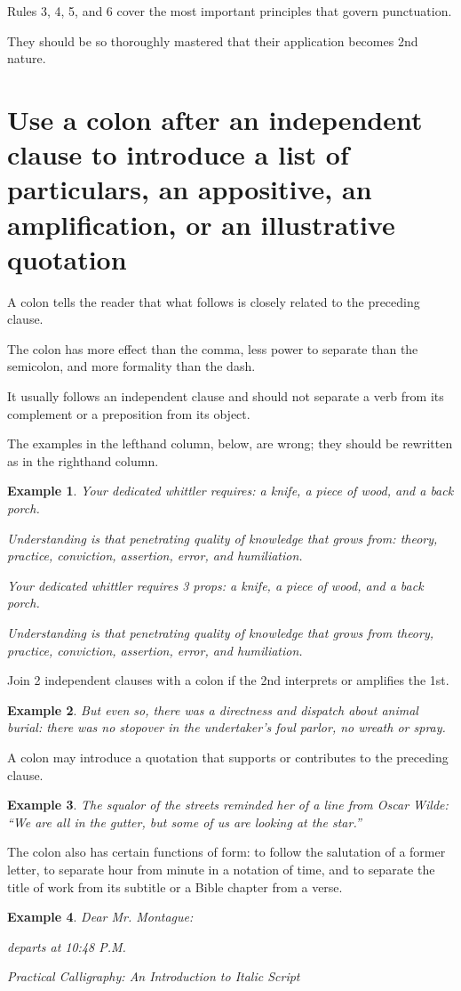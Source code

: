 \documentclass{book}
\numberwithin{equation}{section}
\newtheorem{example}{Example}[chapter]
\begin{document}
%
Rules 3, 4, 5, and 6 cover the most important principles that govern punctuation.

They should be so thoroughly mastered that their application becomes 2nd nature.

\section{Use a colon after an independent clause to introduce a list of particulars, an appositive, an amplification, or an illustrative quotation}
A colon tells the reader that what follows is closely related to the preceding clause.

The colon has more effect than the comma, less power to separate than the semicolon, and more formality than the dash.

It usually follows an independent clause and should not separate a verb from its complement or a preposition from its object.

The examples in the lefthand column, below, are wrong; they should be rewritten as in the righthand column.
\begin{example}
    Your dedicated whittler requires: a knife, a piece of wood, and a back porch.
    
    Understanding is that penetrating quality of knowledge that grows from: theory, practice, conviction, assertion, error, and humiliation.
    
    Your dedicated whittler requires 3 props: a knife, a piece of wood, and a back porch.
    
    Understanding is that penetrating quality of knowledge that grows from theory, practice, conviction, assertion, error, and humiliation.
\end{example}
Join 2 independent clauses with a colon if the 2nd interprets or amplifies the 1st.
\begin{example}
    But even so, there was a directness and dispatch about animal burial: there was no stopover in the undertaker's foul parlor, no wreath or spray.
\end{example}
A colon may introduce a quotation that supports or contributes to the preceding clause.
\begin{example}
    The squalor of the streets reminded her of a line from Oscar Wilde: ``We are all in the gutter, but some of us are looking at the star.''
\end{example}
The colon also has certain functions of form: to follow the salutation of a former letter, to separate hour from minute in a notation of time, and to separate the title of work from its subtitle or a Bible chapter from a verse.
\begin{example}
    Dear Mr. Montague:
    
    departs at 10:48 P.M.
    
    Practical Calligraphy: An Introduction to Italic Script
\end{example}
\end{document}
